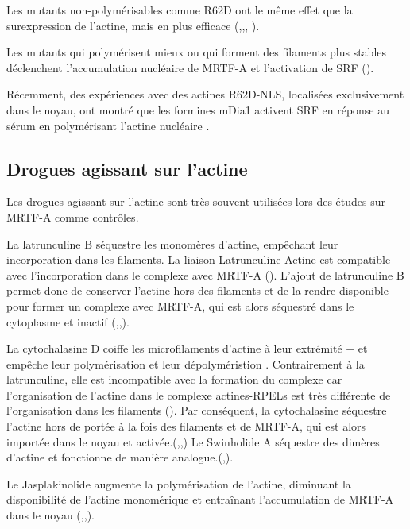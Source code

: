 Les mutants non-polymérisables comme R62D ont le même effet que la surexpression de l'actine, mais en plus efficace (\cite{posern_mutant_2002},\cite{miralles_actin_2003},\cite{vartiainen_nuclear_2007}, \cite{collard_nuclear_2014}). 

Les mutants qui polymérisent mieux ou qui forment des filaments plus stables déclenchent l'accumulation nucléaire de MRTF-A et l'activation de SRF (\cite{posern_mutant_2004}). 

Récemment, des expériences avec des actines R62D-NLS, localisées exclusivement dans le noyau, ont montré que les formines mDia1 activent SRF en réponse au sérum en polymérisant l'actine nucléaire \cite{baarlink_nuclear_2013}. 


\subsection{Drogues agissant sur l'actine}

Les drogues agissant sur l'actine sont très souvent utilisées lors des études sur MRTF-A comme contrôles. 

La latrunculine B séquestre les monomères d'actine, empêchant leur incorporation dans les filaments. La liaison Latrunculine-Actine est compatible avec l'incorporation dans le complexe avec MRTF-A (\cite{mouilleron_molecular_2008}). 
L'ajout de latrunculine B permet donc de conserver l'actine hors des filaments et de la rendre disponible pour former un complexe avec MRTF-A, qui est alors séquestré dans le cytoplasme et inactif (\cite{vartiainen_nuclear_2007},\cite{zhao_force_2007},\cite{smith_induction_2013}). 

La cytochalasine D coiffe les microfilaments d'actine à leur extrémité + et empêche leur polymérisation et leur dépolyméristion . 
Contrairement à la latrunculine, elle est incompatible avec la formation du complexe car l'organisation de l'actine dans le complexe actines-RPELs est très différente de l'organisation dans les filaments (\cite{treisman_structure_2011}). 
Par conséquent, la cytochalasine séquestre l'actine hors de portée à la fois des filaments et de MRTF-A, qui est alors importée dans le noyau et activée.(\cite{miralles_actin_2003},\cite{vartiainen_nuclear_2007},\cite{smith_induction_2013}) Le Swinholide A séquestre des dimères d'actine et fonctionne de manière analogue.(\cite{miralles_actin_2003},\cite{vartiainen_nuclear_2007}).

Le Jasplakinolide augmente la polymérisation de l'actine, diminuant la disponibilité de l'actine monomérique et entraînant l'accumulation de MRTF-A dans le noyau (\cite{miralles_actin_2003},\cite{vartiainen_nuclear_2007},\cite{smith_induction_2013}). 


